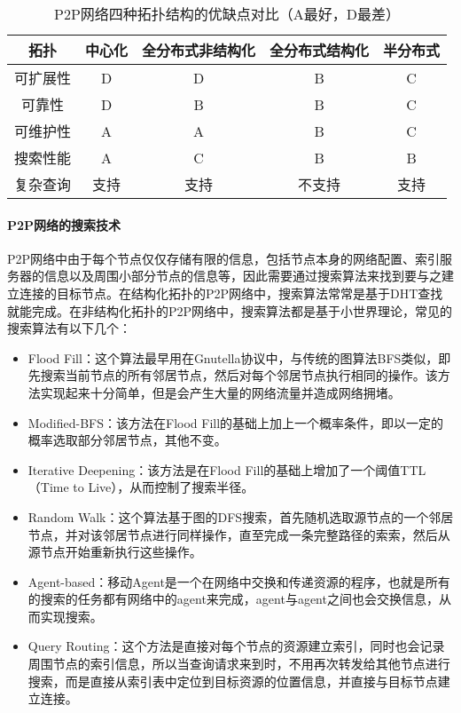 \begin{table}
\caption{P2P网络四种拓扑结构的优缺点对比（A最好，D最差）}
\centering
\begin{tabular}{|c|c|c|c|c|} 
\hline
拓扑 & 中心化 & 全分布式非结构化 & 全分布式结构化 & 半分布式 \\
\hline
可扩展性 & D & D & B & C \\
\hline
可靠性 & D & B & B & C \\
\hline
可维护性 & A & A & B & C \\
\hline
搜索性能 & A & C & B & B \\
\hline
复杂查询 & 支持 & 支持 & 不支持 & 支持 \\
\hline
\end{tabular}
\label{tbl:topologycomp}
\end{table}

\paragraph{P2P网络的搜索技术}
P2P网络中由于每个节点仅仅存储有限的信息，包括节点本身的网络配置、索引服务器的信息以及周围小部分节点的信息等，因此需要通过搜索算法来找到要与之建立连接的目标节点。在结构化拓扑的P2P网络中，搜索算法常常是基于DHT查找就能完成。在非结构化拓扑的P2P网络中，搜索算法都是基于小世界理论\cite{watts1998collective}，常见的搜索算法有以下几个\cite{tsoumakos2006analysis}：

\begin{itemize}
\item Flood Fill：这个算法最早用在Gnutella协议中，与传统的图算法BFS类似，即先搜索当前节点的所有邻居节点，然后对每个邻居节点执行相同的操作。该方法实现起来十分简单，但是会产生大量的网络流量并造成网络拥堵。
\item Modified-BFS：该方法在Flood Fill的基础上加上一个概率条件，即以一定的概率选取部分邻居节点，其他不变。
\item Iterative Deepening：该方法是在Flood Fill的基础上增加了一个阈值TTL（Time to Live），从而控制了搜索半径。
\item Random Walk：这个算法基于图的DFS搜索，首先随机选取源节点的一个邻居节点，并对该邻居节点进行同样操作，直至完成一条完整路径的索索，然后从源节点开始重新执行这些操作\cite{bisnik2005modeling}。
\item Agent-based：移动Agent是一个在网络中交换和传递资源的程序，也就是所有的搜索的任务都有网络中的agent来完成，agent与agent之间也会交换信息，从而实现搜索\cite{babaoglu2002anthill}。
\item Query Routing：这个方法是直接对每个节点的资源建立索引，同时也会记录周围节点的索引信息，所以当查询请求来到时，不用再次转发给其他节点进行搜索，而是直接从索引表中定位到目标资源的位置信息，并直接与目标节点建立连接。
\end{itemize}

